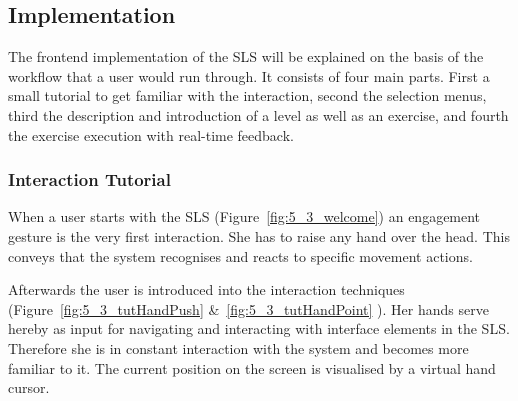 

\subsection{Implementation}
The frontend implementation of the SLS will be explained on the basis of the workflow that a user would run through. It consists of four main parts. First a small tutorial to get familiar with the interaction,  second the selection menus, third the description and introduction of a level as well as an exercise, and fourth the exercise execution with real-time feedback. 

\subsubsection{Interaction Tutorial}
When a user starts with the SLS (Figure~\ref{fig:5_3_welcome}) an engagement gesture is the very first interaction. She has to raise any hand over the head. This conveys that the system recognises and reacts to specific movement actions. 

Afterwards the user is introduced into the interaction techniques (Figure~\ref{fig:5_3_tutHandPush} \&~\ref{fig:5_3_tutHandPoint} ).
Her hands serve hereby as input for navigating and interacting with interface elements in the SLS. Therefore she is in constant interaction with the system and becomes more familiar to it.
The current position on the screen is visualised by a virtual hand cursor.

